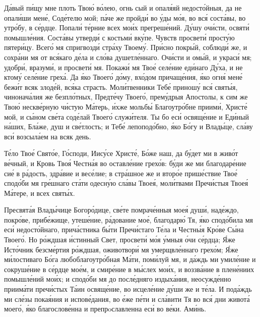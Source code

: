 \begin{mymulticols}

Д\'{а}вый п\'{и}щу мне плоть Тво\'{ю} в\'{о}лею, огнь сый и опал\'{я}яй недост\'{о}йныя, да не опал\'{и}ши мен\'{е}, Сод\'{е}телю мой; п\'{а}че же пройд\'{и} во \'{у}ды м\'{о}я, во вс\'{я} сост\'{а}вы, во утр\'{о}бу, в с\'{е}рдце. Попал\'{и} т\'{е}рние всех мо\'{и}х прегреш\'{е}ний. Д\'{у}шу оч\'{и}сти, освят\'{и} помышл\'{е}ния. Сост\'{а}вы утверд\'{и} с костьм\'{и} вк\'{у}пе. Чувств просвет\'{и} прост\'{у}ю пятер\'{и}цу. Всег\'{о} мя спригвозд\'{и} стр\'{а}ху Твоем\'{у}. Пр\'{и}сно покр\'{ы}й, соблюд\'{и} же, и сохр\'{а}ни мя от вс\'{я}каго д\'{е}ла и сл\'{о}ва душетл\'{е}ннаго. Оч\'{и}сти и ом\'{ы}й, и украс\'{и} мя; удобр\'{и}, вразум\'{и}, и просвет\'{и} мя. Покаж\'{и} мя Тво\'{е} сел\'{е}ние ед\'{и}наго Д\'{у}ха, и не ктом\'{у} сел\'{е}ние грех\'{а}. Да \'{я}ко Твоег\'{о} д\'{о}му, вх\'{о}дом причащ\'{е}ния, \'{я}ко огн\'{я} мен\'{е} беж\'{и}т всяк злод\'{е}й, вс\'{я}ка страсть. Мол\'{и}твенники Теб\'{е} принош\'{у} вс\'{я} свят\'{ы}я, чинонач\'{а}лия же безпл\'{о}тных, Предт\'{е}чу Твоег\'{о}, прем\'{у}дрыя Апостолы, к сим же Тво\'{ю} нескв\'{е}рную ч\'{и}стую М\'{а}терь, \'{и}хже мольб\'{ы} Благоутр\'{о}бне приим\'{и}, Христ\'{е} мой, и с\'{ы}ном св\'{е}та сод\'{е}лай Твоег\'{о} служ\'{и}теля. Ты бо ес\'{и} освящ\'{е}ние и Ед\'{и}ный н\'{а}ших, Бл\'{а}же, душ и св\'{е}тлость; и Теб\'{е} лепопод\'{о}бно, \'{я}ко Б\'{о}гу и Влад\'{ы}це, сл\'{а}ву вс\'{и} возсыл\'{а}ем на всяк день.


Т\'{е}ло Тво\'{е} Свят\'{о}е, Г\'{о}споди, Иис\'{у}се Христ\'{е}, Б\'{о}же наш, да б\'{у}дет ми в жив\'{о}т в\'{е}чный, и Кровь Тво\'{я} Честн\'{а}я во оставл\'{е}ние грех\'{о}в: б\'{у}ди же ми благодар\'{е}ние си\'{е} в р\'{а}дость, здр\'{а}вие и вес\'{е}лие; в стр\'{а}шное же и втор\'{о}е приш\'{е}ствие Тво\'{е} спод\'{о}би мя гр\'{е}шнаго ст\'{а}ти одесн\'{у}ю сл\'{а}вы Твое\'{я}, мол\'{и}твами Преч\'{и}стыя Твое\'{я} М\'{а}тере, и всех свят\'{ы}х.


Пресвят\'{а}я Влад\'{ы}чице Богор\'{о}дице, св\'{е}те помрач\'{е}нныя мое\'{я} душ\'{и}, над\'{е}ждо, покр\'{о}ве, приб\'{е}жище, утеш\'{е}ние, р\'{а}дование мо\'{е}, благодар\'{ю} Тя, \'{я}ко спод\'{о}била мя ес\'{и} недост\'{о}йнаго, прич\'{а}стника б\'{ы}ти Преч\'{и}стаго Т\'{е}ла и Честн\'{ы}я Кр\'{о}ве С\'{ы}на Твоег\'{о}. Но р\'{о}ждшая \'{и}стинный Свет, просвет\'{и} м\'{о}я \'{у}мныя \'{о}чи с\'{е}рдца; \'{Я}же Ист\'{о}чник безсм\'{е}ртия р\'{о}ждшая, оживотвор\'{и} мя умерщвл\'{е}ннаго грех\'{о}м; \'{Я}же м\'{и}лостиваго Б\'{о}га любоблагоутр\'{о}бная М\'{а}ти, пом\'{и}луй мя, и д\'{а}ждь ми умил\'{е}ние и сокруш\'{е}ние в с\'{е}рдце мо\'{е}м, и смир\'{е}ние в м\'{ы}слех мо\'{и}х, и воззв\'{а}ние в плен\'{е}ниих помышл\'{е}ний мо\'{и}х; и спод\'{о}би мя до посл\'{е}дняго издых\'{а}ния, неосужд\'{е}нно приим\'{а}ти преч\'{и}стых Т\'{а}ин освящ\'{е}ние, во исцел\'{е}ние д\'{у}ши же и т\'{е}ла. И под\'{а}ждь ми сл\'{е}зы пока\'{я}ния и испов\'{е}дания, во \'{е}же п\'{е}ти и сл\'{а}вити Тя во вс\'{я} дни живот\'{а} моег\'{о}, \'{я}ко благослов\'{е}нна и препрoславленна ес\'{и} во в\'{е}ки. Ам\'{и}нь.


\end{mymulticols}
